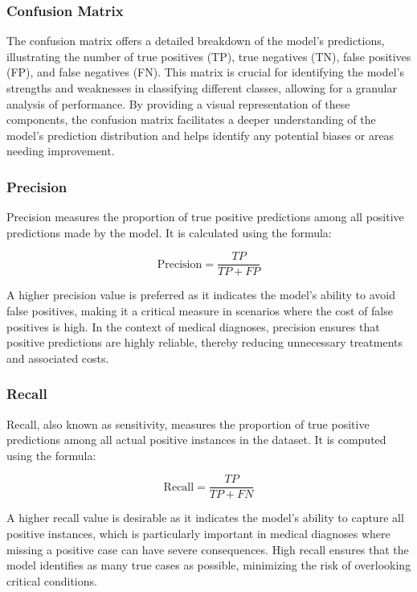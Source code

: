 \subsubsection{Confusion Matrix}

The confusion matrix offers a detailed breakdown of the model's predictions, illustrating the number of true positives (TP), true negatives (TN), false positives (FP), and false negatives (FN). This matrix is crucial for identifying the model's strengths and weaknesses in classifying different classes, allowing for a granular analysis of performance. By providing a visual representation of these components, the confusion matrix facilitates a deeper understanding of the model's prediction distribution and helps identify any potential biases or areas needing improvement.

\subsubsection{Precision}

Precision measures the proportion of true positive predictions among all positive predictions made by the model. It is calculated using the formula:

\[
\text{Precision} = \frac{TP}{TP + FP}
\]

A higher precision value is preferred as it indicates the model's ability to avoid false positives, making it a critical measure in scenarios where the cost of false positives is high. In the context of medical diagnoses, precision ensures that positive predictions are highly reliable, thereby reducing unnecessary treatments and associated costs.

\subsubsection{Recall}

Recall, also known as sensitivity, measures the proportion of true positive predictions among all actual positive instances in the dataset. It is computed using the formula:

\[
\text{Recall} = \frac{TP}{TP + FN}
\]

A higher recall value is desirable as it indicates the model's ability to capture all positive instances, which is particularly important in medical diagnoses where missing a positive case can have severe consequences. High recall ensures that the model identifies as many true cases as possible, minimizing the risk of overlooking critical conditions.

